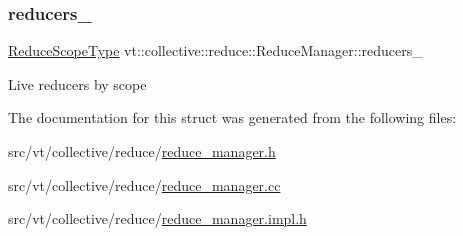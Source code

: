 \subsubsection{\texorpdfstring{reducers\+\_\+}{reducers\_}}
{\footnotesize\ttfamily \hyperlink{structvt_1_1collective_1_1reduce_1_1_reduce_manager_a2c340e5d3b12e4f2df64b9c1502445cf}{Reduce\+Scope\+Type} vt\+::collective\+::reduce\+::\+Reduce\+Manager\+::reducers\+\_\+\hspace{0.3cm}{\ttfamily [private]}}

Live reducers by scope 

The documentation for this struct was generated from the following files\+:\begin{DoxyCompactItemize}
\item 
src/vt/collective/reduce/\hyperlink{reduce__manager_8h}{reduce\+\_\+manager.\+h}\item 
src/vt/collective/reduce/\hyperlink{reduce__manager_8cc}{reduce\+\_\+manager.\+cc}\item 
src/vt/collective/reduce/\hyperlink{reduce__manager_8impl_8h}{reduce\+\_\+manager.\+impl.\+h}\end{DoxyCompactItemize}
